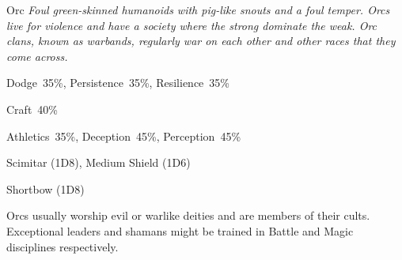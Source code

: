 \newpage

\begin{monsterbox}{Orc}
	\textit{Foul green-skinned humanoids with pig-like snouts and a foul temper. Orcs live for violence and have a society where the strong dominate the weak. Orc clans, known as warbands, regularly war on each other and other races that they come across.}\\
	\rpghline
	\basics[%
        hitpoints  = 11, %
	majorwound = 6,
	damagemodifier = 0,
	powerpoints = 10,
	movementrate = 15m,
	armor = Leather (2AP),
	plunderrating = 2
	]
	\rpghline%
	\stats[ %
		STR = 4D6 (14),
		CON = 3D6 (11),
		DEX = 4D6 (14),
		SIZ = 2D6+3 (10),
		INT = 3D6   (11),
		POW = 2D6+3 (10),
		CHA = 2D6   (7)
	]
	\rpghline%
	\begin{rpg-monsteraction}[Resistances]
		Dodge~35\%, Persistence~35\%, Resilience~35\%
	\end{rpg-monsteraction}
	\begin{rpg-monsteraction}[Knowledge]
    		Craft~40\%
	\end{rpg-monsteraction}
	\begin{rpg-monsteraction}[Practical]
		Athletics~35\%, Deception~45\%, Perception~45\%
	\end{rpg-monsteraction}
	\begin{rpg-monsteraction}
		Scimitar (1D8), Medium Shield (1D6)
	\end{rpg-monsteraction}
	\begin{rpg-monsteraction}
		Shortbow (1D8)
	\end{rpg-monsteraction}
	\begin{rpg-monsteraction}[Supernatural]
		Orcs usually worship evil or warlike deities and are members of their cults. Exceptional leaders and shamans might be trained in Battle and Magic disciplines respectively.
	\end{rpg-monsteraction}

\end{monsterbox}

\newpage

